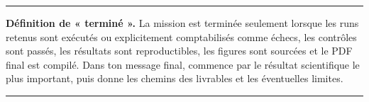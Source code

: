 \documentclass[11pt,a4paper]{article}
\newenvironment{briefbox}
  {\begin{center}\begin{minipage}{0.94\textwidth}\color{navy}\hrule\vspace{0.7em}}
  {\vspace{0.5em}\hrule\end{minipage}\end{center}}
\begin{document}
\begin{briefbox}
\textbf{Définition de « terminé ».} La mission est terminée seulement lorsque
les runs retenus sont exécutés ou explicitement comptabilisés comme échecs,
les contrôles sont passés, les résultats sont reproductibles, les figures sont
sourcées et le PDF final est compilé. Dans ton message final, commence par le
résultat scientifique le plus important, puis donne les chemins des livrables
et les éventuelles limites.
\end{briefbox}
\end{document}
